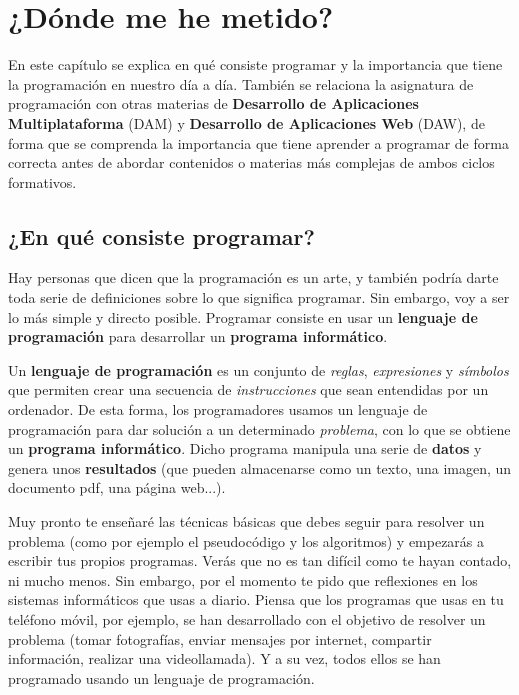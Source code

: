 
\chapter{¿Dónde me he metido?}

En este capítulo se explica en qué consiste programar y la importancia que tiene la programación en nuestro día a día. 
También se relaciona la asignatura de programación con otras materias de \textbf{Desarrollo de Aplicaciones Multiplataforma} (DAM)
y \textbf{Desarrollo de Aplicaciones Web} (DAW), de forma que se comprenda la importancia que tiene aprender a programar de forma correcta
antes de abordar contenidos o materias más complejas de ambos ciclos formativos.

\section{¿En qué consiste programar?}

Hay personas que dicen que la programación es un arte, y también podría darte toda serie de definiciones sobre
lo que significa programar. Sin embargo, voy a ser lo más simple y directo posible. Programar consiste en usar 
un \textbf{lenguaje de programación} para desarrollar un \textbf{programa informático}.

Un \textbf{lenguaje de programación} es un conjunto de \textit{reglas}, \textit{expresiones} y \textit{símbolos} que
permiten crear una secuencia de \textit{instrucciones} que sean entendidas por un ordenador. De esta forma, 
los programadores usamos un lenguaje de programación para dar solución a un
determinado \textit{problema}, con lo que se obtiene un \textbf{programa informático}. Dicho programa manipula
una serie de \textbf{datos} y genera unos \textbf{resultados} (que pueden almacenarse como un texto, una imagen, 
un documento pdf, una página web...). 

Muy pronto te enseñaré las técnicas básicas que debes seguir para resolver un problema (como por ejemplo el pseudocódigo
y los algoritmos) y empezarás a escribir tus propios programas. Verás que no es tan difícil como te hayan contado, ni mucho
menos. Sin embargo, por el momento te pido que reflexiones en los sistemas informáticos que usas a diario. Piensa que los
 programas que usas en tu teléfono móvil, por ejemplo, se han desarrollado con el objetivo de resolver un problema
(tomar fotografías, enviar mensajes por internet, compartir información, realizar una videollamada). Y a su vez, todos ellos
se han programado usando un lenguaje de programación.

